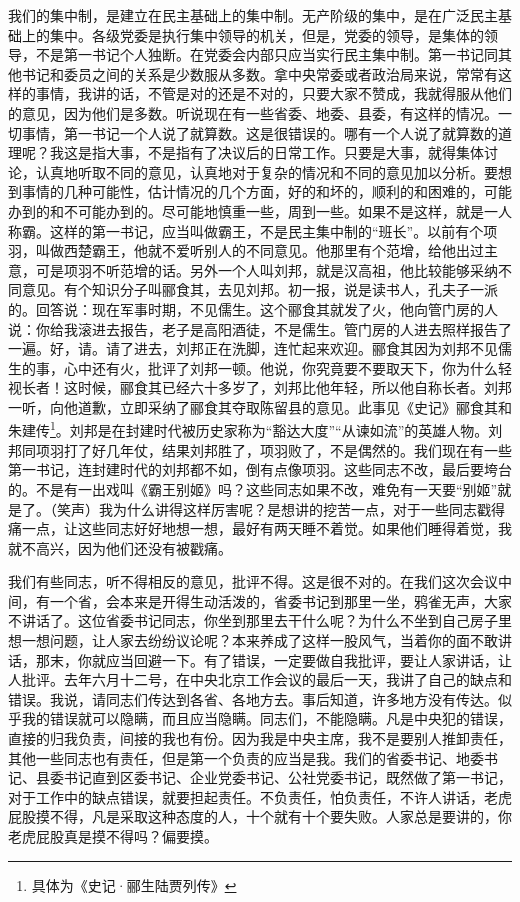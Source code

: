 我们的集中制，是建立在民主基础上的集中制。无产阶级的集中，是在广泛民主基础上的集中。各级党委是执行集中领导的机关，但是，党委的领导，是集体的领导，不是第一书记个人独断。在党委会内部只应当实行民主集中制。第一书记同其他书记和委员之间的关系是少数服从多数。拿中央常委或者政治局来说，常常有这样的事情，我讲的话，不管是对的还是不对的，只要大家不赞成，我就得服从他们的意见，因为他们是多数。听说现在有一些省委、地委、县委，有这样的情况。一切事情，第一书记一个人说了就算数。这是很错误的。哪有一个人说了就算数的道理呢？我这是指大事，不是指有了决议后的日常工作。只要是大事，就得集体讨论，认真地听取不同的意见，认真地对于复杂的情况和不同的意见加以分析。要想到事情的几种可能性，估计情况的几个方面，好的和坏的，顺利的和困难的，可能办到的和不可能办到的。尽可能地慎重一些，周到一些。如果不是这样，就是一人称霸。这样的第一书记，应当叫做霸王，不是民主集中制的“班长”。以前有个项羽，叫做西楚霸王，他就不爱听别人的不同意见。他那里有个范增，给他出过主意，可是项羽不听范增的话。另外一个人叫刘邦，就是汉高祖，他比较能够采纳不同意见。有个知识分子叫郦食其，去见刘邦。初一报，说是读书人，孔夫子一派的。回答说：现在军事时期，不见儒生。这个郦食其就发了火，他向管门房的人说：你给我滚进去报告，老子是高阳酒徒，不是儒生。管门房的人进去照样报告了一遍。好，请。请了进去，刘邦正在洗脚，连忙起来欢迎。郦食其因为刘邦不见儒生的事，心中还有火，批评了刘邦一顿。他说，你究竟要不要取天下，你为什么轻视长者！这时候，郦食其已经六十多岁了，刘邦比他年轻，所以他自称长者。刘邦一听，向他道歉，立即采纳了郦食其夺取陈留县的意见。此事见《史记》郦食其和朱建传\footnote{具体为《史记·郦生陆贾列传》}。刘邦是在封建时代被历史家称为“豁达大度”“从谏如流”的英雄人物。刘邦同项羽打了好几年仗，结果刘邦胜了，项羽败了，不是偶然的。我们现在有一些第一书记，连封建时代的刘邦都不如，倒有点像项羽。这些同志不改，最后要垮台的。不是有一出戏叫《霸王别姬》吗？这些同志如果不改，难免有一天要“别姬”就是了。（笑声）我为什么讲得这样厉害呢？是想讲的挖苦一点，对于一些同志戳得痛一点，让这些同志好好地想一想，最好有两天睡不着觉。如果他们睡得着觉，我就不高兴，因为他们还没有被戳痛。

我们有些同志，听不得相反的意见，批评不得。这是很不对的。在我们这次会议中间，有一个省，会本来是开得生动活泼的，省委书记到那里一坐，鸦雀无声，大家不讲话了。这位省委书记同志，你坐到那里去干什么呢？为什么不坐到自己房子里想一想问题，让人家去纷纷议论呢？本来养成了这样一股风气，当着你的面不敢讲话，那末，你就应当回避一下。有了错误，一定要做自我批评，要让人家讲话，让人批评。去年六月十二号，在中央北京工作会议的最后一天，我讲了自己的缺点和错误。我说，请同志们传达到各省、各地方去。事后知道，许多地方没有传达。似乎我的错误就可以隐瞒，而且应当隐瞒。同志们，不能隐瞒。凡是中央犯的错误，直接的归我负责，间接的我也有份。因为我是中央主席，我不是要别人推卸责任，其他一些同志也有责任，但是第一个负责的应当是我。我们的省委书记、地委书记、县委书记直到区委书记、企业党委书记、公社党委书记，既然做了第一书记，对于工作中的缺点错误，就要担起责任。不负责任，怕负责任，不许人讲话，老虎屁股摸不得，凡是采取这种态度的人，十个就有十个要失败。人家总是要讲的，你老虎屁股真是摸不得吗？偏要摸。

